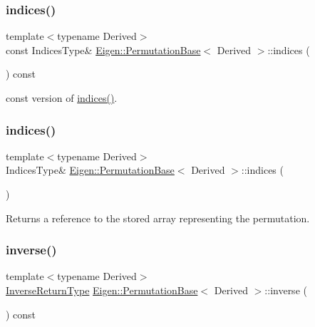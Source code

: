 \subsubsection{\texorpdfstring{indices()}{indices()}\hspace{0.1cm}{\footnotesize\ttfamily [1/2]}}
{\footnotesize\ttfamily template$<$typename Derived$>$ \\
const Indices\+Type\& \mbox{\hyperlink{class_eigen_1_1_permutation_base}{Eigen\+::\+Permutation\+Base}}$<$ Derived $>$\+::indices (\begin{DoxyParamCaption}{ }\end{DoxyParamCaption}) const\hspace{0.3cm}{\ttfamily [inline]}}

const version of \mbox{\hyperlink{class_eigen_1_1_permutation_base_a16fa3afafdf703399d62c80f950802f1}{indices()}}. \mbox{\label{class_eigen_1_1_permutation_base_a16fa3afafdf703399d62c80f950802f1}} 
\subsubsection{\texorpdfstring{indices()}{indices()}\hspace{0.1cm}{\footnotesize\ttfamily [2/2]}}
{\footnotesize\ttfamily template$<$typename Derived$>$ \\
Indices\+Type\& \mbox{\hyperlink{class_eigen_1_1_permutation_base}{Eigen\+::\+Permutation\+Base}}$<$ Derived $>$\+::indices (\begin{DoxyParamCaption}{ }\end{DoxyParamCaption})\hspace{0.3cm}{\ttfamily [inline]}}

\begin{DoxyReturn}{Returns}
a reference to the stored array representing the permutation. 
\end{DoxyReturn}
\mbox{\label{class_eigen_1_1_permutation_base_adb9af427f317202366c2832876064eb3}} 
\subsubsection{\texorpdfstring{inverse()}{inverse()}}
{\footnotesize\ttfamily template$<$typename Derived$>$ \\
\mbox{\hyperlink{class_eigen_1_1_inverse}{Inverse\+Return\+Type}} \mbox{\hyperlink{class_eigen_1_1_permutation_base}{Eigen\+::\+Permutation\+Base}}$<$ Derived $>$\+::inverse (\begin{DoxyParamCaption}{ }\end{DoxyParamCaption}) const\hspace{0.3cm}{\ttfamily [inline]}}

